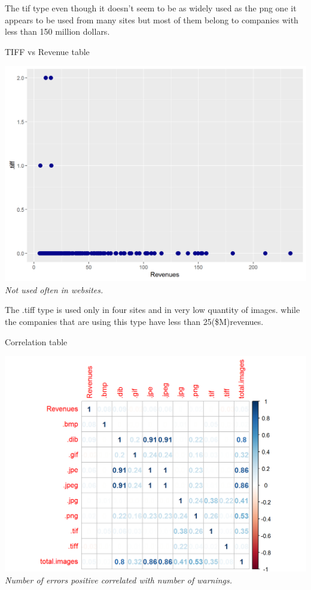 \documentclass{article}
\begin{document}
The tif type even though it doesn't seem to be as widely used as the png one it appears to be used from many sites but most of them belong to companies with less than 150 million dollars.
\begin{table}[H]
\centering
\caption{TIFF vs Revenue table}
\begin{center}
\includegraphics[scale=0.5]{../R/photos/62_tiff_rev.png}    \\
\textit{Not used often in websites.}
\end{center}
\end{table}
The .tiff type is used only in four sites and in very low quantity of images. while the companies that are using this type have less than 25(\$M)revenues.
\begin{table}[H]
\centering
\caption{Correlation table}
\begin{center}
\includegraphics[scale=0.5]{../R/photos/63_img_cor.png}    \\
\textit{Number of errors positive correlated with number of warnings.}
\end{center}
\end{table}
\end{document}
